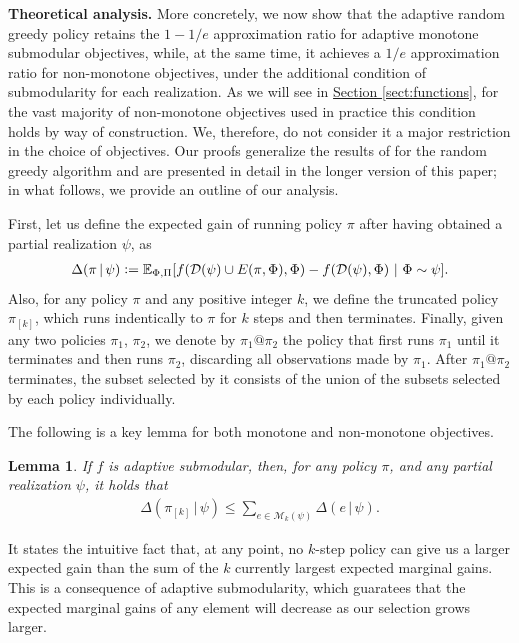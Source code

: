 \documentclass{article}
\newcommand{\sectref}[1]{\hyperref[#1]{Section \ref*{#1}}}
\newtheorem{lemma}{Lemma}
\newcommand{\defeq}{\vcentcolon=}
\newcommand{\mmid}{\,\vert\,}
\newcommand{\D}[2]{\Delta(#1\mmid#2)}
\newcommand{\pik}{\pi_{[k]}}
\newcommand{\dom}{\mathcal{D}}
\newcommand{\Mk}{\mathcal{M}_k}
\renewcommand{\paragraph}[1]{\vspace{0.3em}\noindent\textbf{#1.}\makebox[0.5em]{}}
\begin{document}
\paragraph{Theoretical analysis}
More concretely, we now show that the adaptive random greedy policy retains the $1-1/e$ approximation ratio for adaptive monotone submodular objectives, while, at the same time, it achieves a $1/e$ approximation ratio for non-monotone objectives, under the additional condition of submodularity for each realization.
As we will see in \sectref{sect:functions}, for the vast majority of non-monotone objectives used in practice this condition holds by way of construction.
We, therefore, do not consider it a major restriction in the choice of objectives.
Our proofs generalize the results of \cite{buchbinder14} for the random greedy algorithm and are presented in detail in the longer version of this paper; in what follows, we provide an outline of our analysis.

First, let us define the expected gain of running policy $\pi$ after having obtained a partial realization $\psi$, as
{\small
\begin{align*}
  \D{\pi}{\psi} \defeq \E[\Phi,\Pi]{f(\dom(\psi) \cup E(\pi, \Phi), \Phi) - f(\dom(\psi), \Phi)}[\Phi \sim \psi].
\end{align*}}
Also, for any policy $\pi$ and any positive integer $k$, we define the truncated policy $\pik$, which runs indentically to $\pi$ for $k$ steps and then terminates.
Finally, given any two policies $\pi_1$, $\pi_2$, we denote by $\pi_1@\pi_2$ the policy that first runs $\pi_1$ until it terminates and then runs $\pi_2$, discarding all observations made by $\pi_1$.
After $\pi_1@\pi_2$ terminates, the subset selected by it consists of the union of the subsets selected by each policy individually.

The following is a key lemma for both monotone and non-monotone objectives.
\setcounter{lemma}{0}
\begin{lemma}\label{lem:submod}
  If $f$ is adaptive submodular, then, for any policy $\pi$, and any partial realization $\psi$, it holds that
  \begin{align*}
    \D{\pik}{\psi} \leq \sum_{e \in \Mk(\psi)} \D{e}{\psi}.
  \end{align*}
\end{lemma}
\noindent It states the intuitive fact that, at any point, no $k$-step policy can give us a larger expected gain than the sum of the $k$ currently largest expected marginal gains.
This is a consequence of adaptive submodularity, which guaratees that the expected marginal gains of any element will decrease as our selection grows larger.
\end{document}
